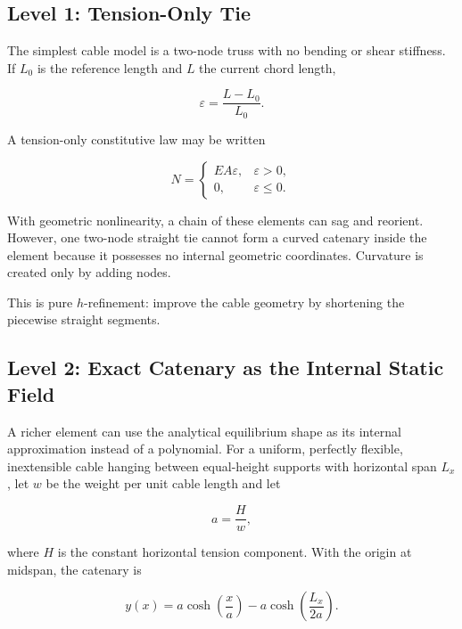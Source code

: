 \subsection{Level 1: Tension-Only Tie}

The simplest cable model is a two-node truss with no bending or shear
stiffness.  If $L_0$ is the reference length and $L$ the current chord length,

\begin{equation}
    \varepsilon=\frac{L-L_0}{L_0}.
\end{equation}

A tension-only constitutive law may be written

\begin{equation}
    N=\begin{cases}
        EA\varepsilon, & \varepsilon>0,\\
        0, & \varepsilon\le0.
    \end{cases}
\end{equation}

With geometric nonlinearity, a chain of these elements can sag and reorient.
However, one two-node straight tie cannot form a curved catenary inside the
element because it possesses no internal geometric coordinates.  Curvature is
created only by adding nodes.

This is pure $h$-refinement: improve the cable geometry by shortening the
piecewise straight segments.

\subsection{Level 2: Exact Catenary as the Internal Static Field}

A richer element can use the analytical equilibrium shape as its internal
approximation instead of a polynomial.  For a uniform, perfectly flexible,
inextensible cable hanging between equal-height supports with horizontal span
$L_x$, let $w$ be the weight per unit cable length and let

\begin{equation}
    a=\frac{H}{w},
\end{equation}

where $H$ is the constant horizontal tension component.  With the origin at
midspan, the catenary is

\begin{equation}\label{eq:catenary-shape}
    \boxed{
    y(x)=a\cosh\left(\frac{x}{a}\right)
    -a\cosh\left(\frac{L_x}{2a}\right)
    }.
\end{equation}

